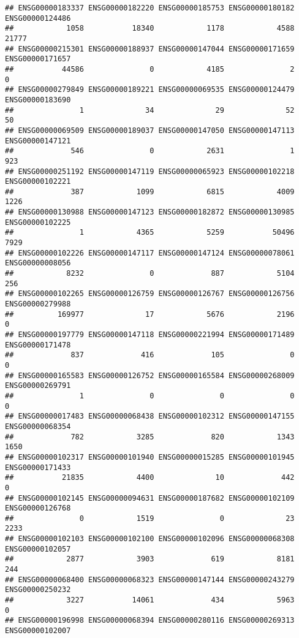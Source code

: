 \documentclass[
]{article}
\begin{document}
\begin{verbatim}
## ENSG00000183337 ENSG00000182220 ENSG00000185753 ENSG00000180182 ENSG00000124486 
##            1058           18340            1178            4588           21777 
## ENSG00000215301 ENSG00000188937 ENSG00000147044 ENSG00000171659 ENSG00000171657 
##           44586               0            4185               2               0 
## ENSG00000279849 ENSG00000189221 ENSG00000069535 ENSG00000124479 ENSG00000183690 
##               1              34              29              52              50 
## ENSG00000069509 ENSG00000189037 ENSG00000147050 ENSG00000147113 ENSG00000147121 
##             546               0            2631               1             923 
## ENSG00000251192 ENSG00000147119 ENSG00000065923 ENSG00000102218 ENSG00000102221 
##             387            1099            6815            4009            1226 
## ENSG00000130988 ENSG00000147123 ENSG00000182872 ENSG00000130985 ENSG00000102225 
##               1            4365            5259           50496            7929 
## ENSG00000102226 ENSG00000147117 ENSG00000147124 ENSG00000078061 ENSG00000008056 
##            8232               0             887            5104             256 
## ENSG00000102265 ENSG00000126759 ENSG00000126767 ENSG00000126756 ENSG00000279988 
##          169977              17            5676            2196               0 
## ENSG00000197779 ENSG00000147118 ENSG00000221994 ENSG00000171489 ENSG00000171478 
##             837             416             105               0               0 
## ENSG00000165583 ENSG00000126752 ENSG00000165584 ENSG00000268009 ENSG00000269791 
##               1               0               0               0               0 
## ENSG00000017483 ENSG00000068438 ENSG00000102312 ENSG00000147155 ENSG00000068354 
##             782            3285             820            1343            1650 
## ENSG00000102317 ENSG00000101940 ENSG00000015285 ENSG00000101945 ENSG00000171433 
##           21835            4400              10             442               0 
## ENSG00000102145 ENSG00000094631 ENSG00000187682 ENSG00000102109 ENSG00000126768 
##               0            1519               0              23            2233 
## ENSG00000102103 ENSG00000102100 ENSG00000102096 ENSG00000068308 ENSG00000102057 
##            2877            3903             619            8181             244 
## ENSG00000068400 ENSG00000068323 ENSG00000147144 ENSG00000243279 ENSG00000250232 
##            3227           14061             434            5963               0 
## ENSG00000196998 ENSG00000068394 ENSG00000280116 ENSG00000269313 ENSG00000102007 

\end{verbatim}
\end{document}
